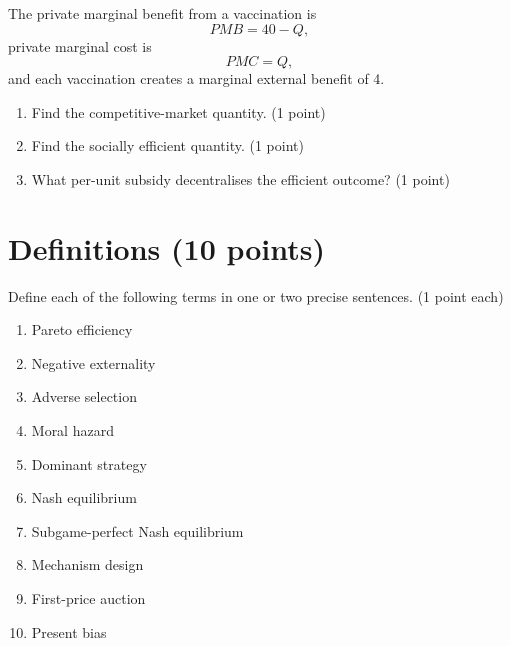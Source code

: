 \documentclass[11pt,a4paper]{article}
\begin{document}
The private marginal benefit from a vaccination is
\[
PMB=40-Q,
\]
private marginal cost is
\[
PMC=Q,
\]
and each vaccination creates a marginal external benefit of 4.

\begin{enumerate}[label=\textbf{\alph*.}]
  \item Find the competitive-market quantity. \hfill (1 point)
  \item Find the socially efficient quantity. \hfill (1 point)
  \item What per-unit subsidy decentralises the efficient outcome?
        \hfill (1 point)
\end{enumerate}

\newpage
\section{Definitions \hfill (10 points)}

Define each of the following terms in one or two precise sentences.
\hfill (1 point each)

\begin{enumerate}[label=\textbf{\alph*.},itemsep=1.38em]
  \item Pareto efficiency
  \item Negative externality
  \item Adverse selection
  \item Moral hazard
  \item Dominant strategy
  \item Nash equilibrium
  \item Subgame-perfect Nash equilibrium
  \item Mechanism design
  \item First-price auction
  \item Present bias
\end{enumerate}
\end{document}
